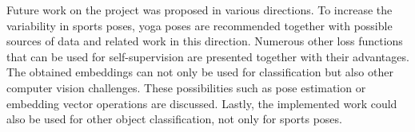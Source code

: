 Future work on the project was proposed in various directions. To increase the variability in sports poses, yoga poses are recommended together with possible sources of data and related work in this direction. Numerous other loss functions that can be used for self-supervision are presented together with their advantages. The obtained embeddings can not only be used for classification but also other computer vision challenges. These possibilities such as pose estimation or embedding vector operations are discussed. Lastly, the implemented work could also be used for other object classification, not only for sports poses. 
